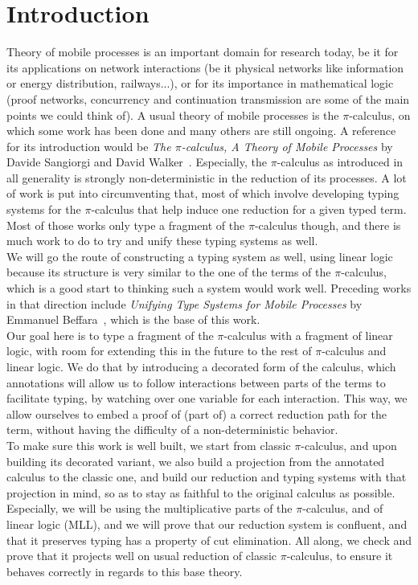 
\section*{Introduction}

Theory of mobile processes is an important domain for research today, be it for its applications on network interactions (be it physical networks like information or energy distribution, railways...), or for its importance in mathematical logic (proof networks, concurrency and continuation transmission are some of the main points we could think of). A usual theory of mobile processes is the $\pi$-calculus, on which some work has been done and many others are still ongoing. A reference for its introduction would be \emph{The $\pi$-calculus, A Theory of Mobile Processes} by Davide Sangiorgi and David Walker~\cite{sangiorgi-2001-pi-calculus}. Especially, the $\pi$-calculus as introduced in all generality is strongly non-deterministic in the reduction of its processes. A lot of work is put into circumventing that, most of which involve developing typing systems for the $\pi$-calculus that help induce one reduction for a given typed term. Most of those works only type a fragment of the $\pi$-calculus though, and there is much work to do to try and unify these typing systems as well.\\
We will go the route of constructing a typing system as well, using linear logic because its structure is very similar to the one of the terms of the $\pi$-calculus, which is a good start to thinking such a system would work well. Preceding works in that direction include \emph{Unifying Type Systems for Mobile Processes} by Emmanuel Beffara~\cite{beffara-2015-unifying}, which is the base of this work.\\
Our goal here is to type a fragment of the $\pi$-calculus with a fragment of linear logic, with room for extending this in the future to the rest of $\pi$-calculus and linear logic. We do that by introducing a decorated form of the calculus, which annotations will allow us to follow interactions between parts of the terms to facilitate typing, by watching over one variable for each interaction. This way, we allow ourselves to embed a proof of (part of) a correct reduction path for the term, without having the difficulty of a non-deterministic behavior.\\
To make sure this work is well built, we start from classic $\pi$-calculus, and upon building its decorated variant, we also build a projection from the annotated calculus to the classic one, and build our reduction and typing systems with that projection in mind, so as to stay as faithful to the original calculus as possible.\\
Especially, we will be using the multiplicative parts of the $\pi$-calculus, and of linear logic (MLL), and we will prove that our reduction system is confluent, and that it preserves typing has a property of cut elimination. All along, we check and prove that it projects well on usual reduction of classic $\pi$-calculus, to ensure it behaves correctly in regards to this base theory.\\~\\

